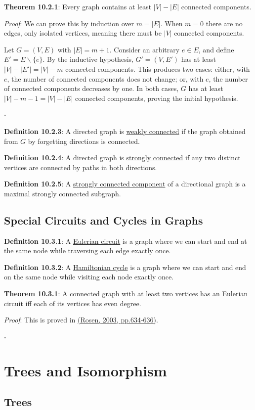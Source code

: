 \documentclass{article}
\newcommand{\separate}[1] {\vspace{#1 pt}\noindent}
\newcommand{\definition}[2]{\textbf{Definition #1}: #2\label{def:#1}}
\newcommand{\proof}[2]{\textit{Proof}: #2 \begin{flushright}\(\square\)\end{flushright}\label{prf:#1}}
\newcommand{\theorem}[3]{\textbf{Theorem #1}: #2 \par\separate{3}\proof{thm:#1}{#3}\label{thm:#1}}
\begin{document}
\newpage\noindent\theorem{10.2.1}{Every graph contains at least \(|V|-|E|\) connected components.}
{We can prove this by induction over \(m=|E|\). When \(m=0\) there are no edges, only isolated vertices, meaning there must be \(|V|\) connected components.

Let \(G=(V,E)\) with \(|E|=m+1\). Consider an arbitrary \(e\in E\), and define \(E'=E \backslash \{e\}\). By the inductive hypothesis, \(G'=(V,E')\) has at least \(|V|-|E'|=|V|-m\) connected components. This produces two cases: either, with \(e\), the number of connected components does not change; or, with \(e\), the number of connected components decreases by one. In both cases, \(G\) has at least \(|V|-m-1=|V|-|E|\) connected components, proving the initial hypothesis.}

\separate{5}\definition{10.2.3}{A directed graph is \underline{weakly connected} if the graph obtained from \(G\) by forgetting directions is connected.}

\separate{5}\definition{10.2.4}{A directed graph is \underline{strongly connected} if any two distinct vertices are connected by paths in both directions.}

\separate{5}\definition{10.2.5}{A \underline{strongly connected component} of a directional graph is a maximal strongly connected subgraph.}

\subsection{Special Circuits and Cycles in Graphs}

\definition{10.3.1}{A \underline{Eulerian circuit} is a graph where we can start and end at the same node while traversing each edge exactly once.}

\separate{5}\definition{10.3.2}{A \underline{Hamiltonian cycle} is a graph where we can start and end on the same node while visiting each node exactly once.}

\separate{5}\theorem{10.3.1}{A connected graph with at least two vertices has an Eulerian circuit iff each of its vertices has even degree.}
{This is proved in \hyperref[cit:2.eulerianCircuits]{(Rosen, 2003, pp.634-636)}.}

\section{Trees and Isomorphism}

\subsection{Trees}
\end{document}
